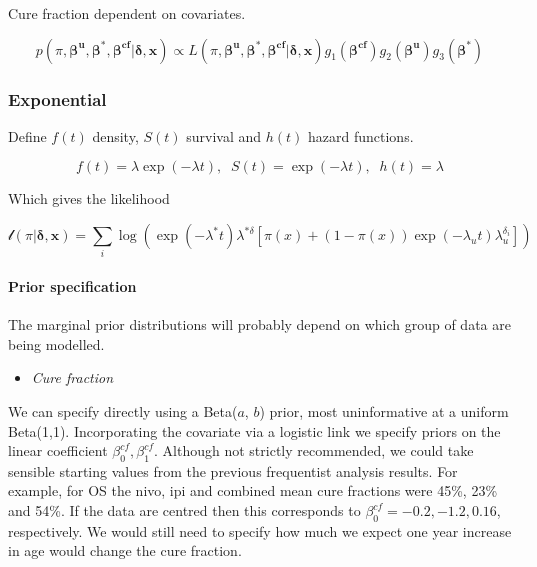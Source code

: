 \documentclass[
]{article}
\providecommand{\tightlist}{%
  \setlength{\itemsep}{0pt}\setlength{\parskip}{0pt}}
\begin{document}
Cure fraction dependent on covariates.

\[
p(\pi, \boldsymbol{\beta^u},\boldsymbol{\beta^*}, \boldsymbol{\beta^{cf}} | \boldsymbol{\delta}, \boldsymbol{x}) \propto L(\pi, \boldsymbol{\beta^u},\boldsymbol{\beta^*}, \boldsymbol{\beta^{cf}} | \boldsymbol{\delta}, \boldsymbol{x}) g_1(\boldsymbol{\beta^{cf}})  g_2(\boldsymbol{\beta^u}) g_3(\boldsymbol{\beta^*})
\]

\hypertarget{exponential}{%
\subsubsection{Exponential}\label{exponential}}

Define \(f(t)\) density, \(S(t)\) survival and \(h(t)\) hazard
functions.

\[
f(t) = \lambda \exp(-\lambda t), \;\; S(t) = \exp(-\lambda t), \;\; h(t) = \lambda
\]

Which gives the likelihood

\[
\mathcal{l}(\pi | \boldsymbol{\delta}, \boldsymbol{x}) =
 \sum_i \log(\exp(-\lambda^* t) \lambda^{* \delta}[\pi(x) +
   (1 − \pi(x)) \exp(-\lambda_u t) \lambda_u^{\delta_i}])
\]

\hypertarget{prior-specification}{%
\paragraph{Prior specification}\label{prior-specification}}

The marginal prior distributions will probably depend on which group of
data are being modelled.

\begin{itemize}
\tightlist
\item
  \emph{Cure fraction}
\end{itemize}

We can specify directly using a Beta(\(a\), \(b\)) prior, most
uninformative at a uniform Beta(1,1). Incorporating the covariate via a
logistic link we specify priors on the linear coefficient
\(\beta^{cf}_0, \beta^{cf}_1\). Although not strictly recommended, we
could take sensible starting values from the previous frequentist
analysis results. For example, for OS the nivo, ipi and combined mean
cure fractions were 45\%, 23\% and 54\%. If the data are centred then
this corresponds to \(\beta^{cf}_0 = -0.2, -1.2, 0.16\), respectively.
We would still need to specify how much we expect one year increase in
age would change the cure fraction.
\end{document}
